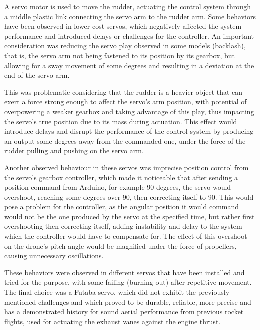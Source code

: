 A servo motor is used to move the rudder, actuating the control system through a middle plastic link connecting the servo arm to the rudder arm.
Some behaviors have been observed in lower cost servos, which negatively affected the system performance and introduced delays or challenges for the controller. 
An important consideration was reducing the servo play observed in some models (backlash), that is, the servo arm not being fastened to its position by its gearbox, but allowing for a sway movement of some degrees and resulting in a deviation at the end of the servo arm. 

This was problematic considering that the rudder is a heavier object that can exert a force strong enough to affect the servo’s arm position, with potential of overpowering a weaker gearbox and taking advantage of this play,  thus impacting the servo’s true position due to its mass during actuation.
This effect would introduce delays and disrupt the performance of the control system by producing an output some degrees away from the commanded one, under the force of the rudder pulling and pushing on the servo arm. 
 
Another observed behaviour in these servos was imprecise position control from the servo’s gearbox controller, which made it noticeable that after sending a position command from Arduino, for example 90 degrees, the servo would overshoot, reaching some degrees over 90, then correcting itself to 90. 
This would pose a problem for the controller, as the angular position it would command would not be the one produced by the servo at the specified time, but rather first overshooting then  correcting itself, adding instability and delay to the system which the controller would have to compensate for. The effect of this overshoot on the drone's pitch angle would be magnified under the force of propellers, causing unnecessary oscillations. 
 
These behaviors were observed in different servos that have been installed and tried for the purpose, with some failing (burning out) after repetitive movement. The final choice was a Futaba servo, which did not exhibit the previously mentioned challenges and which proved to be durable, reliable, more precise and has a demonstrated history for sound aerial performance from previous rocket flights, used for actuating the exhaust vanes against the engine thrust. 
 
